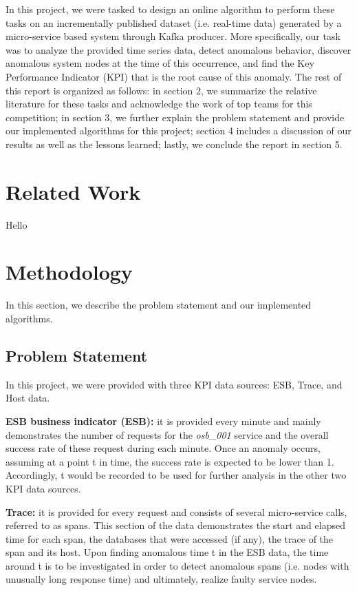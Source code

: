 \documentclass[12pt]{article}
\begin{document}
In this project, we were tasked to design an online algorithm to perform these tasks on an incrementally published dataset (i.e. real-time data) generated by a micro-service based system through Kafka producer. More specifically, our task was to analyze the provided time series data, detect anomalous behavior, discover anomalous system nodes at the time of this occurrence, and find the Key Performance Indicator (KPI) that is the root cause of this anomaly. The rest of this report is organized as follows: in section 2, we summarize the relative literature for these tasks and acknowledge the work of top teams for this competition; in section 3, we further explain the problem statement and provide our implemented algorithms for this project; section 4 includes a discussion of our results as well as the lessons learned; lastly, we conclude the report in section 5. 
\section{Related Work}
Hello
\section{Methodology} %
In this section, we describe the problem statement and our implemented algorithms.

\vspace{-0.2cm}
\subsection{Problem Statement}
In this project, we were provided with three KPI data sources: ESB, Trace, and Host data.

\smallskip\smallskip
\noindent \textbf{ESB business indicator (ESB): }it is provided every minute and mainly demonstrates the number of requests for the \textit{osb\_001} service and the overall success rate of these request during each minute. Once an anomaly occurs, assuming at a point t in time, the success rate is expected to be lower than 1. Accordingly, t would be recorded to be used for further analysis in the other two KPI data sources.

\smallskip
\noindent \textbf{Trace: }it is provided for every request and consists of several micro-service calls, referred to as spans. This section of the data demonstrates the start and elapsed time for each span, the databases that were accessed (if any), the trace of the span and its host. Upon finding anomalous time t in the ESB data, the time around t is to be investigated in order to detect anomalous spans (i.e. nodes with unusually long response time) and ultimately, realize faulty service nodes. 
\end{document}

